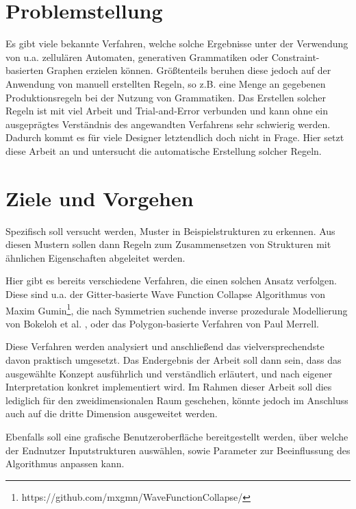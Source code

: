 \section{Problemstellung}
Es gibt viele bekannte Verfahren, welche solche Ergebnisse unter der Verwendung von u.a. zellulären Automaten, generativen
Grammatiken oder Constraint-basierten Graphen erzielen können. \cite{5_van_der_linden_et_al} Größtenteils beruhen diese jedoch auf der Anwendung
von manuell erstellten Regeln, so z.B. eine Menge an gegebenen Produktionsregeln bei der Nutzung von Grammatiken. Das Erstellen
solcher Regeln ist mit viel Arbeit und Trial-and-Error verbunden und kann ohne ein ausgeprägtes Verständnis des angewandten Verfahrens
sehr schwierig werden. Dadurch kommt es für viele Designer letztendlich doch nicht in Frage. Hier setzt diese Arbeit an und untersucht
die automatische Erstellung solcher Regeln.

\section{Ziele und Vorgehen}
Spezifisch soll versucht werden, Muster in Beispielstrukturen zu erkennen. Aus diesen Mustern sollen dann Regeln zum Zusammensetzen
von Strukturen mit ähnlichen Eigenschaften abgeleitet werden.

Hier gibt es bereits verschiedene Verfahren, die einen solchen Ansatz verfolgen. Diese sind u.a. der Gitter-basierte Wave Function
Collapse Algorithmus von Maxim Gumin\footnote{https://github.com/mxgmn/WaveFunctionCollapse/}, die nach Symmetrien suchende inverse
prozedurale Modellierung von Bokeloh et al. \cite{3_bokeloh_et_al}, oder das Polygon-basierte Verfahren von Paul Merrell. \cite{1_merrell}

Diese Verfahren werden analysiert und anschließend das vielversprechendste davon praktisch umgesetzt. Das Endergebnis der Arbeit
soll dann sein, dass das ausgewählte Konzept ausführlich und verständlich erläutert, und nach eigener Interpretation konkret
implementiert wird. Im Rahmen dieser Arbeit soll dies lediglich für den zweidimensionalen Raum geschehen, könnte jedoch im Anschluss
auch auf die dritte Dimension ausgeweitet werden.

Ebenfalls soll eine grafische Benutzeroberfläche bereitgestellt werden, über welche der Endnutzer Inputstrukturen auswählen, sowie
Parameter zur Beeinflussung des Algorithmus anpassen kann.